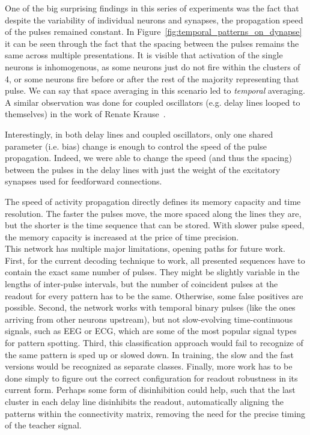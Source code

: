 One of the big surprising findings in this series of experiments was the fact that despite the variability of individual neurons and synapses, the propagation speed of the pulses remained constant. In Figure~\ref{fig:temporal_patterns_on_dynapse} it can be seen through the fact that the spacing between the pulses remains the same across multiple presentations. It is visible that activation of the single neurons is inhomogenous, as some neurons just do not fire within the clusters of 4, or some neurons fire before or after the rest of the majority representing that pulse. We can say that space averaging in this scenario led to \emph{temporal} averaging. A similar observation was done for coupled oscillators (e.g. delay lines looped to themselves) in the work of Renate Krause~\cite{Krause_etal21}.

Interestingly, in both delay lines and coupled oscillators, only one shared parameter (i.e. bias) change is enough to control the speed of the pulse propagation. Indeed, we were able to change the speed (and thus the spacing) between the pulses in the delay lines with just the weight of the excitatory synapses used for feedforward connections.

The speed of activity propagation directly defines its memory capacity and time resolution. The faster the pulses move, the more spaced along the lines they are, but the shorter is the time sequence that can be stored. With slower pulse speed, the memory capacity is increased at the price of time precision.\\


This network has multiple major limitations, opening paths for future work. First, for the current decoding technique to work, all presented sequences have to contain the exact same number of pulses. They might be slightly variable in the lengths of inter-pulse intervals, but the number of coincident pulses at the readout for every pattern has to be the same. Otherwise, some false positives are possible. Second, the network works with temporal binary pulses (like the ones arriving from other neurons upstream), but not slow-evolving time-continuous signals, such as EEG or ECG, which are some of the most popular signal types for pattern spotting. Third, this classification approach would fail to recognize of the same pattern is sped up or slowed down. In training, the slow and the fast versions would be recognized as separate classes. Finally, more work has to be done simply to figure out the correct configuration for readout robustness in its current form. Perhaps some form of disinhibition could help, such that the last cluster in each delay line disinhibits the readout, automatically aligning the patterns within the connectivity matrix, removing the need for the precise timing of the teacher signal.\\

